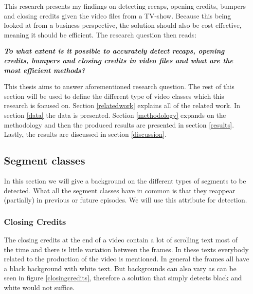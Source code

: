\documentclass{article}
\begin{document}
This research presents my findings on detecting recaps, opening credits, bumpers and closing credits given the video files from a TV-show. Because this being looked at from a business perspective, the solution should also be cost effective, meaning it should be efficient. The research question then reads:
\newline
\begin{adjustwidth}{0.3in}{0.3in}
\textit{\textbf{To what extent is it possible to accurately detect recaps, opening credits, bumpers and closing credits in video files and what are the most efficient methods? \newline}}
\end{adjustwidth}
This thesis aims to answer aforementioned research question. The rest of this section will be used to define the different type of video classes which this research is focused on. Section \ref{relatedwork} explains all of the related work. In section \ref{data} the data is presented. Section \ref{methodology} expands on the methodology and then the produced results are presented in section \ref{results}. Lastly, the results are discussed in section \ref{discussion}.

\subsection{Segment classes} \label{section:segmentclasses}
In this section we will give a background on the different types of segments to be detected. What all the segment classes have in common is that they reappear (partially) in previous or future episodes. We will use this attribute for detection. 

\subsubsection{Closing Credits}
The closing credits at the end of a video contain a lot of scrolling text most of the time and there is little variation between the frames. In these texts everybody related to the production of the video is mentioned. In general the frames all have a black background with white text. But backgrounds can also vary as can be seen in figure \ref{closingcredits}, therefore a solution that simply detects black and white would not suffice.
\end{document}
